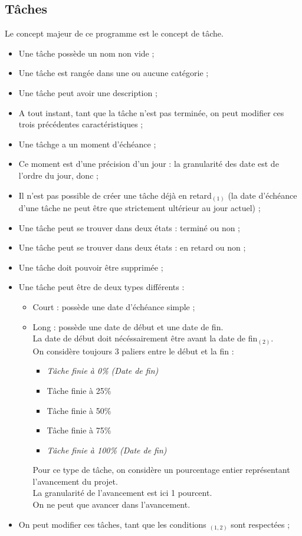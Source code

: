 \documentclass{article}
\begin{document}
		\subsection{Tâches}
			Le concept majeur de ce programme est le concept de tâche.
			\begin{itemize}
				\item Une tâche possède un nom non vide ;
				\item Une tâche est rangée dans une ou aucune catégorie ;
				\item Une tâche peut avoir une description ;
				\item A tout instant, tant que la tâche n'est pas terminée, on peut modifier ces trois précédentes caractéristiques ;
				\item Une tâchge a un moment d'échéance ;
				\item Ce moment est d'une précision d'un jour : la granularité des date est de l'ordre du jour, donc ;
				\item Il n'est pas possible de créer une tâche déjà en retard$_{(1)}$ (la date d'échéance d'une tâche ne peut être que strictement ultérieur au jour actuel) ;
				\item Une tâche peut se trouver dans deux états : terminé ou non ;
				\item Une tâche peut se trouver dans deux états : en retard ou non ;
				\item Une tâche doit pouvoir être supprimée ;
				\item Une tâche peut être de deux types différents :
				\begin{itemize}
					\item Court : possède une date d'échéance simple ;
					\item Long : possède une date de début et une date de fin.\\
						La date de début doit nécéssairement être avant la date de fin$_{(2)}$.\\
						On considère toujours 3 paliers entre le début et la fin :
						\begin{itemize}
							\item \textit{Tâche finie à 0\% (Date de fin)}
							\item Tâche finie à 25\%
							\item Tâche finie à 50\%
							\item Tâche finie à 75\%
							\item \textit{Tâche finie à 100\% (Date de fin)}
						\end{itemize}
						Pour ce type de tâche, on considère un pourcentage entier représentant l'avancement du projet.\\La granularité de l'avancement est ici 1 pourcent.\\
						On ne peut que avancer dans l'avancement. 
				\end{itemize}
				\item On peut modifier ces tâches, tant que les conditions $_{(1,2)}$ sont respectées ; 
			\end{itemize}
\end{document}
